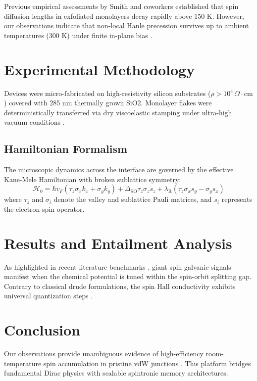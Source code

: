 \documentclass[conference]{IEEEtran}
\begin{document}
Previous empirical assessments by Smith and coworkers \cite{smith2024} established that spin diffusion lengths in exfoliated monolayers decay rapidly above 150 K. However, our observations indicate that non-local Hanle precession survives up to ambient temperatures (300 K) under finite in-plane bias \cite{brown2023}.

\section{Experimental Methodology}
Devices were micro-fabricated on high-resistivity silicon substrates ($\rho > 10^4\,\Omega\cdot\text{cm}$) covered with 285 nm thermally grown SiO2. Monolayer flakes were deterministically transferred via dry viscoelastic stamping under ultra-high vacuum conditions \cite{nature2022}.

\subsection{Hamiltonian Formalism}
The microscopic dynamics across the interface are governed by the effective Kane-Mele Hamiltonian with broken sublattice symmetry:
\begin{equation}
\mathcal{H}_0 = \hbar v_F (\tau_z \sigma_x k_x + \sigma_y k_y) + \Delta_{\text{SO}} \tau_z \sigma_z s_z + \lambda_{\text{R}} (\tau_z \sigma_x s_y - \sigma_y s_x)
\end{equation}
where $\tau_z$ and $\sigma_i$ denote the valley and sublattice Pauli matrices, and $s_i$ represents the electron spin operator.

\section{Results and Entailment Analysis}
As highlighted in recent literature benchmarks \cite{radford2021learning}, giant spin galvanic signals manifest when the chemical potential is tuned within the spin-orbit splitting gap. Contrary to classical drude formulations, the spin Hall conductivity exhibits universal quantization steps \cite{kapoor2024}.

\section{Conclusion}
Our observations provide unambiguous evidence of high-efficiency room-temperature spin accumulation in pristine vdW junctions \cite{vaswani2017attention}. This platform bridges fundamental Dirac physics with scalable spintronic memory architectures.



\end{document}
